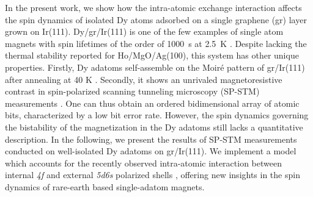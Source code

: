 \documentclass[
reprint,amsmath,amssymb,aps]{revtex4-2}
\begin{document}
In the present work, we show how the intra-atomic exchange interaction affects the spin dynamics of isolated Dy atoms adsorbed on a single graphene (gr) layer grown on Ir(111). Dy/gr/Ir(111) is one of the few examples of single atom magnets \cite{Natterer2018,kiralyOrbitallyDerivedSingleatom2018} with spin lifetimes of the order of 1000~s at 2.5~K \cite{baltic2016}. Despite lacking the thermal stability reported for Ho/MgO/Ag(100), this system has other unique properties. Firstly, Dy adatoms self-assemble on the Moiré pattern of gr/Ir(111) after annealing at 40 K \cite{pivettaDirectCaptureElectrostatic2018}. Secondly, it shows an unrivaled magnetoresistive contrast in spin-polarized scanning tunneling microscopy (SP-STM) measurements \cite{pivettaMeasuringIntraAtomicExchange2020}. One can thus obtain an ordered bidimensional array of atomic bits, characterized by a low bit error rate.
However, the spin dynamics governing the bistability of the magnetization in the Dy adatoms still lacks a quantitative  description.
In the following, we present the results of SP-STM  measurements conducted  on  well-isolated  Dy  adatoms on gr/Ir(111). We implement a model which accounts for the  recently  observed  intra-atomic  interaction  between internal \textit{4f} and  external \textit{5d6s} polarized  shells  \cite{pivettaMeasuringIntraAtomicExchange2020}, offering new insights in the spin dynamics  of  rare-earth  based  single-adatom  magnets.
\end{document}

